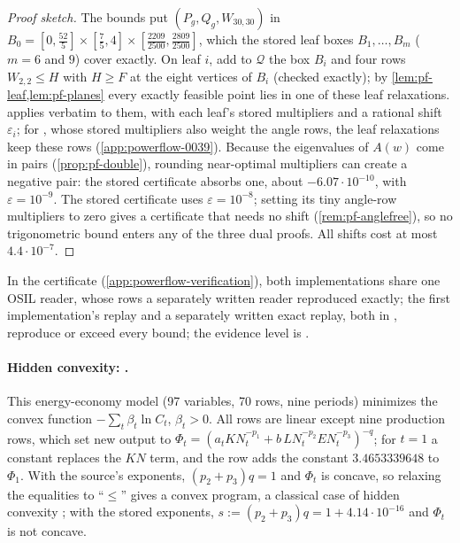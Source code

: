\begin{proof}[Proof sketch]
The bounds put $(P_g,Q_g,W_{30,30})$ in $B_0=[0,\frac{52}{5}]\times[\frac75,4]\times[\frac{2209}{2500},\frac{2809}{2500}]$, which the stored leaf boxes $B_1,\dots,B_m$ ($m=6$ and $9$) cover exactly.
On leaf $i$, add to $\mathcal Q$ the box $B_i$ and four rows $W_{2,2}\le H$ with $H\ge F$ at the eight vertices of $B_i$ (checked exactly); by \cref{lem:pf-leaf,lem:pf-planes} every exactly feasible point lies in one of these leaf relaxations.
 applies verbatim to them, with each leaf's stored multipliers and a rational shift $\varepsilon_i$; for , whose stored multipliers also weight the angle rows, the leaf relaxations keep these rows (\cref{app:powerflow-0039}).
Because the eigenvalues of $A(w)$ come in pairs (\cref{prop:pf-double}), rounding near-optimal multipliers can create a negative pair: the stored  certificate absorbs one, about $-6.07\cdot10^{-10}$, with $\varepsilon=10^{-9}$.
The stored  certificate uses $\varepsilon=10^{-8}$; setting its tiny angle-row multipliers to zero gives a certificate that needs no shift (\cref{rem:pf-anglefree}), so no trigonometric bound enters any of the three dual proofs.
All shifts cost at most $4.4\cdot10^{-7}$.
\end{proof}

In the certificate (\cref{app:powerflow-verification}), both implementations share one OSIL reader, whose rows a separately written reader reproduced exactly; the first implementation's replay and a separately written exact replay, both in , reproduce or exceed every bound; the evidence level is .

\paragraph{Hidden convexity: .}
This energy-economy model (97 variables, 70 rows, nine periods) minimizes the convex function $-\sum_t\beta_t\ln C_t$, $\beta_t>0$.
All rows are linear except nine production rows, which set new output to $\Phi_t=(a_tK\!N_t^{-p_1}+b\,L\!N_t^{-p_2}E\!N_t^{-p_3})^{-q}$; for $t=1$ a constant replaces the $K\!N$ term, and the row adds the constant $3.4653339648$ to $\Phi_1$.
With the source's exponents, $(p_2+p_3)q=1$ and $\Phi_t$ is concave, so relaxing the equalities to ``$\le$'' gives a convex program, a classical case of hidden convexity \citep{xia2020-a-survey-of-hidden-convex}; with the stored exponents, $s:=(p_2+p_3)q=1+4.14\cdot10^{-16}$ and $\Phi_t$ is not concave.


